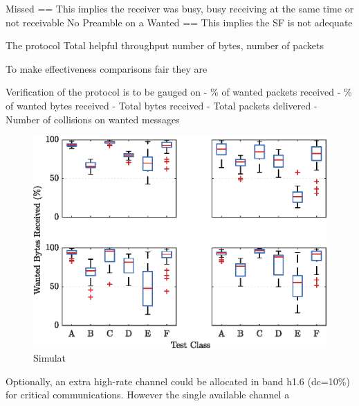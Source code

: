 Missed == This implies the receiver was busy, busy receiving at the same time or not receivable 
No Preamble on a Wanted == This implies the SF is not adequate

The protocol 
Total helpful throughput number of bytes,  number of packets



To make effectiveness comparisons fair they are 


Verification of the protocol is to be gauged on 
 - \% of wanted packets received
 - \% of wanted bytes received
 - Total bytes received
 - Total packets delivered
 - Number of collisions on wanted messages

\begin{figure}[H]
    \centering
   	\includegraphics{Figures/sim_recv_boxplots}
    \caption[Boxplot of protocol received byte percentage]{
    	Simulat
    }
    \label{fig:sim_recv_boxplots}
\end{figure}

Optionally, an extra high-rate channel could be allocated in band h1.6 (\ac{dc}=10\%) for critical communications. However the single available channel a



